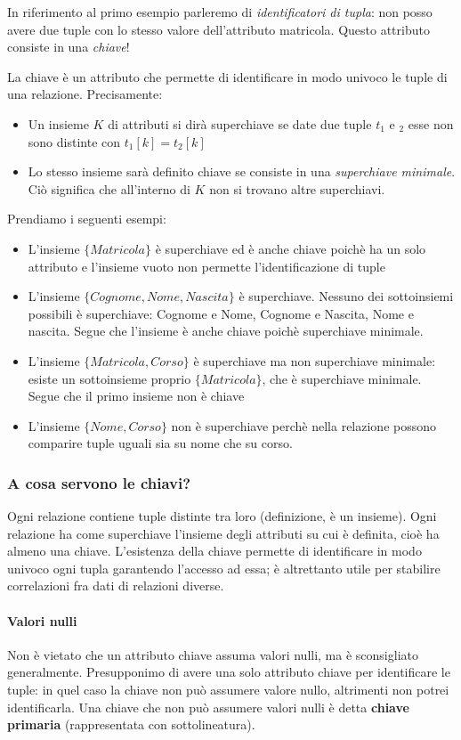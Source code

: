 \noindent In riferimento al primo esempio parleremo di \emph{identificatori di tupla}: non posso avere due tuple con lo stesso valore dell'attributo matricola. Questo attributo consiste in una \emph{chiave}!
\begin{definizione}[Chiave]
	La chiave è un attributo che permette di identificare in modo univoco le tuple di una relazione. Precisamente:
	\begin{itemize}
		\item Un insieme $K$ di attributi si dirà superchiave se date due tuple $t_1$ e $_2$ esse non sono distinte con $t_1[k]=t_2[k]$
		\item Lo stesso insieme sarà definito chiave se consiste in una \emph{superchiave minimale}. Ciò significa che all'interno di $K$ non si trovano altre superchiavi.
	\end{itemize}
	Prendiamo i seguenti esempi:
	\begin{itemize}
		\item L'insieme $\{Matricola\}$ è superchiave ed è anche chiave poichè ha un solo attributo e l'insieme vuoto non permette l'identificazione di tuple
		\item L'insieme $\{Cognome,Nome,Nascita\}$ è superchiave. Nessuno dei sottoinsiemi possibili è superchiave: Cognome e Nome, Cognome e Nascita, Nome e nascita. Segue che l'insieme è anche chiave poichè superchiave minimale.
		\item L'insieme $\{Matricola,Corso\}$ è superchiave ma non superchiave minimale: esiste un sottoinsieme proprio $\{Matricola\}$, che è superchiave minimale. Segue che il primo insieme non è chiave
		\item L'insieme $\{Nome,Corso\}$ non è superchiave perchè nella relazione possono comparire tuple uguali sia su nome che su corso.
	\end{itemize}
\end{definizione}

\subsubsection{A cosa servono le chiavi?}
Ogni relazione contiene tuple distinte tra loro (definizione, è un insieme). Ogni relazione ha come superchiave l'insieme degli attributi su cui è definita, cioè ha almeno una chiave. L'esistenza della chiave permette di identificare in modo univoco ogni tupla garantendo l'accesso ad essa; è altrettanto utile per stabilire correlazioni fra dati di relazioni diverse. 
\paragraph{Valori nulli} Non è vietato che un attributo chiave assuma valori nulli, ma è sconsigliato generalmente. Presupponimo di avere una solo attributo chiave per identificare le tuple: in quel caso la chiave non può assumere valore nullo, altrimenti non potrei identificarla. Una chiave che non può assumere valori nulli è detta \textbf{chiave primaria} (rappresentata con sottolineatura).


